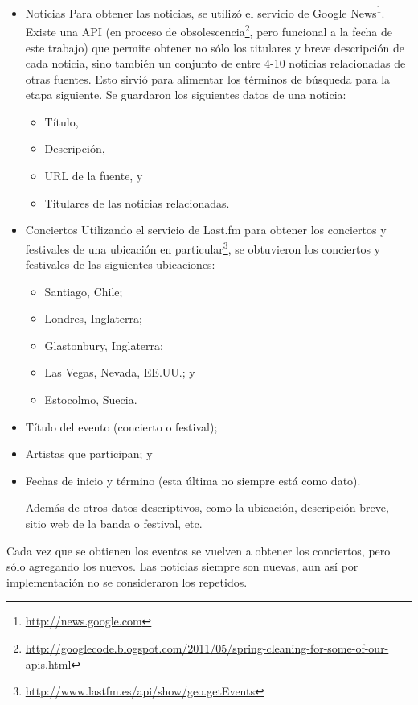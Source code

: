 \begin{itemize}
\item Noticias
  Para obtener las noticias, se utilizó el servicio de Google
  News\footnote{\href{http://news.google.com}{http://news.google.com} }. Existe una API (en proceso de
  obsolescencia\footnote{\href{http://googlecode.blogspot.com/2011/05/spring-cleaning-for-some-of-our-apis.html}{http://googlecode.blogspot.com/2011/05/spring-cleaning-for-some-of-our-apis.html} },
  pero funcional a la fecha de este trabajo) que permite
  obtener no sólo los titulares y breve descripción de cada noticia,
  sino también un conjunto de entre 4-10 noticias relacionadas de otras
  fuentes. Esto sirvió para alimentar los términos de búsqueda para la
  etapa siguiente. Se guardaron los siguientes datos de una noticia:

\begin{itemize}
\item Título,
\item Descripción,
\item URL de la fuente, y
\item Titulares de las noticias relacionadas.
\end{itemize}

\item Conciertos
  Utilizando el servicio de Last.fm para obtener los conciertos y
  festivales de una ubicación en
  particular\footnote{\href{http://www.lastfm.es/api/show/geo.getEvents}{http://www.lastfm.es/api/show/geo.getEvents} }, se
  obtuvieron los conciertos y festivales de las siguientes
  ubicaciones:

\begin{itemize}
\item Santiago, Chile;
\item Londres, Inglaterra;
\item Glastonbury, Inglaterra;
\item Las Vegas, Nevada, EE.UU.; y
\item Estocolmo, Suecia.
\end{itemize}

\item Título del evento (concierto o festival);
\item Artistas que participan; y
\item Fechas de inicio y término (esta última no siempre está como
    dato).

  Además de otros datos descriptivos, como la ubicación, descripción
  breve, sitio web de la banda o festival, etc.
\end{itemize}
Cada vez que se obtienen los eventos se vuelven a obtener los
conciertos, pero sólo agregando los nuevos. Las noticias siempre son
nuevas, aun así por implementación no se consideraron los repetidos.


